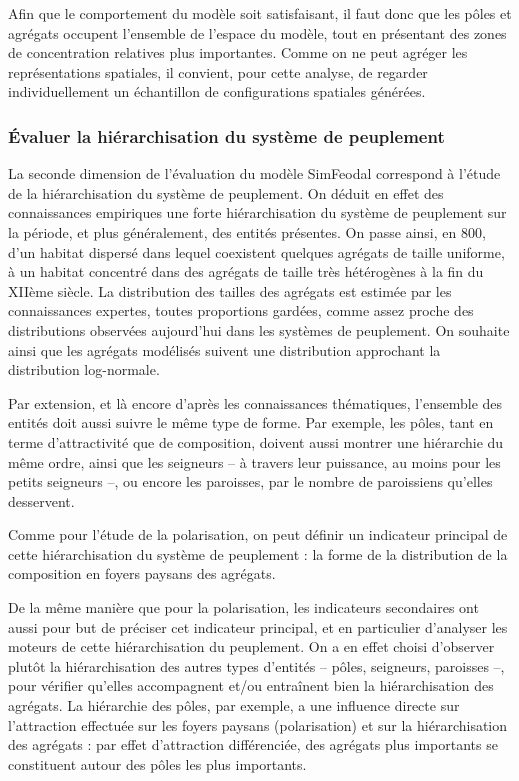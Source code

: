 Afin que le comportement du modèle soit satisfaisant, il faut donc que les pôles et agrégats occupent l'ensemble de l'espace du modèle, tout en présentant des zones de concentration relatives plus importantes.
Comme on ne peut agréger les représentations spatiales, il convient, pour cette analyse, de regarder individuellement un échantillon de configurations spatiales générées.

\subsubsection{Évaluer la hiérarchisation du système de peuplement}

La seconde dimension de l'évaluation du modèle SimFeodal correspond à l'étude de la hiérarchisation du système de peuplement.
On déduit en effet des connaissances empiriques une forte hiérarchisation du système de peuplement sur la période, et plus généralement, des entités présentes.
On passe ainsi, en 800, d'un habitat dispersé dans lequel coexistent quelques agrégats de taille uniforme, à un habitat concentré dans des agrégats de taille très hétérogènes à la fin du XIIème siècle.
La distribution des tailles des agrégats est estimée par les connaissances expertes, toutes proportions gardées, comme assez proche des distributions observées aujourd'hui dans les systèmes de peuplement.
On souhaite ainsi que les agrégats modélisés suivent une distribution approchant la distribution log-normale.

Par extension, et là encore d'après les connaissances thématiques, l'ensemble des entités doit aussi suivre le même type de forme.
Par exemple, les pôles, tant en terme d'attractivité que de composition, doivent aussi montrer une hiérarchie du même ordre, ainsi que les seigneurs -- à travers leur puissance, au moins pour les petits seigneurs --, ou encore les paroisses, par le nombre de paroissiens qu'elles desservent.

Comme pour l'étude de la polarisation, on peut définir un indicateur principal de cette hiérarchisation du système de peuplement :
la forme de la distribution de la composition en foyers paysans des agrégats.

De la même manière que pour la polarisation, les indicateurs secondaires ont aussi pour but de préciser cet indicateur principal, et en particulier d'analyser les moteurs de cette hiérarchisation du peuplement.
On a en effet choisi d'observer plutôt la hiérarchisation des autres types d'entités -- pôles, seigneurs, paroisses --, pour vérifier qu'elles accompagnent et/ou entraînent bien la hiérarchisation des agrégats.
La hiérarchie des pôles, par exemple, a une influence directe sur l'attraction effectuée sur les foyers paysans (polarisation) et sur la hiérarchisation des agrégats :
par effet d'attraction différenciée, des agrégats plus importants se constituent autour des pôles les plus importants.

